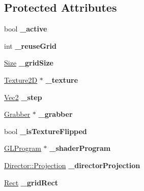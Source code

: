 \subsection*{Protected Attributes}
\begin{DoxyCompactItemize}
\item 
\mbox{\label{classGridBase_ab1a9b57b9338480f5febdfcf3ab858d0}} 
bool {\bfseries \+\_\+active}
\item 
\mbox{\label{classGridBase_a5d28544fcb429006a2a3c0f325f7f216}} 
int {\bfseries \+\_\+reuse\+Grid}
\item 
\mbox{\label{classGridBase_a401d350ea76120bd34b665a9d6955244}} 
\hyperlink{classSize}{Size} {\bfseries \+\_\+grid\+Size}
\item 
\mbox{\label{classGridBase_a91381d2aa92cd479136adca71cb6ffc6}} 
\hyperlink{classTexture2D}{Texture2D} $\ast$ {\bfseries \+\_\+texture}
\item 
\mbox{\label{classGridBase_a534632aae4ecba9c0413265c2122a857}} 
\hyperlink{classVec2}{Vec2} {\bfseries \+\_\+step}
\item 
\mbox{\label{classGridBase_a81543b85860a9f4655f8ef5c2824799c}} 
\hyperlink{classGrabber}{Grabber} $\ast$ {\bfseries \+\_\+grabber}
\item 
\mbox{\label{classGridBase_a1d09120b84bbd8ccb79d47b8afea7132}} 
bool {\bfseries \+\_\+is\+Texture\+Flipped}
\item 
\mbox{\label{classGridBase_a2f5d0963683466a35688bec5fc482f75}} 
\hyperlink{classGLProgram}{G\+L\+Program} $\ast$ {\bfseries \+\_\+shader\+Program}
\item 
\mbox{\label{classGridBase_a307336a56285428c1fbee469358de14e}} 
\hyperlink{classDirector_aaa3d9a0eac7c805d87ecba67c974fcf2}{Director\+::\+Projection} {\bfseries \+\_\+director\+Projection}
\item 
\mbox{\label{classGridBase_a73179a14616b93ab7dc56f81f197e094}} 
\hyperlink{classRect}{Rect} {\bfseries \+\_\+grid\+Rect}
\end{DoxyCompactItemize}
